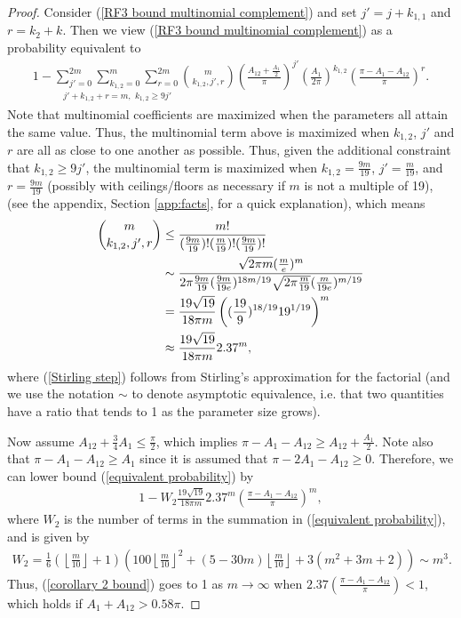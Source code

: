 \documentclass[twoside,11pt]{article}
\begin{document}
\begin{proof}
Consider (\ref{RF3 bound multinomial complement})  and set $j' = j + k_{1,1}$ and $r = k_2 + k$. Then we view (\ref{RF3 bound multinomial complement}) as a probability equivalent to 
\begin{align}\label{equivalent probability}
1 - \underset{j'+k_{1,2}+r = m, \,\, k_{1,2} \geq 9j'}{\sum_{j'=0}^{2m} \sum_{k_{1,2}=0}^m \sum_{r=0}^{2m}} \binom{m}{k_{1,2},j',r} \left(\frac{A_{12}+\frac{A_1}{2}}{\pi} \right)^{j'} \left(\frac{A_1}{2\pi} \right)^{k_{1,2}} \left(\frac{\pi-A_1-A_{12}}{\pi} \right)^{r}.
\end{align}
Note that multinomial coefficients are maximized when the parameters all attain the same value. Thus, the multinomial term above is maximized when $  k_{1,2}$, $j'$ and $r$ are all as close to one another as possible. Thus, given the additional constraint that $k_{1,2} \geq 9j'$, 
the multinomial term is maximized when $k_{1,2}=\frac{9m}{19}$, $j' = \frac{m}{19}$, and $r = \frac{9m}{19}$ (possibly with ceilings/floors as necessary if $m$ is not a multiple of 19), (see the appendix, Section \ref{app:facts}, for a quick explanation),
which means
\begin{align}
\binom{m}{k_{1,2},j',r} &\leq \frac{m!}{(\frac{9m}{19})!(\frac{m}{19})!(\frac{9m}{19})!} \label{facts} \\
&\sim \frac{\sqrt{2\pi m}(\frac{m}{e})^m}{2\pi \frac{9m}{19} (\frac{9m}{19e})^{18m/19} \sqrt{2\pi \frac{m}{19}}(\frac{m}{19e})^{m/19} }\label{Stirling step} \\
&= \frac{19\sqrt{19}}{18\pi m} \left( (\frac{19}{9})^{18/19} {19^{1/19}} \right)^m \notag \\
&\approx \frac{19\sqrt{19}}{18\pi m} 2.37^m, \label{trinomial bound}
\end{align}
where (\ref{Stirling step}) follows from Stirling's approximation for the factorial (and we use the notation $\sim$ to denote asymptotic equivalence, i.e. that two quantities have a ratio that tends to 1 as the parameter size grows). 

Now assume $A_{12} + \frac{3}{4}A_1 \leq \frac{\pi}{2}$, which implies $\pi-A_1-A_{12} \geq A_{12} + \frac{A_1}{2}$. Note also that $\pi-A_1 - A_{12} \geq A_1$ since it is assumed that $\pi-2A_1 - A_{12}\geq 0$. Therefore, we can lower bound (\ref{equivalent probability}) by
\begin{align}\label{corollary 2 bound}
1 - W_2\frac{19\sqrt{19}}{18\pi m} 2.37^m \left(\frac{\pi-A_1-A_{12}}{\pi} \right)^m,
\end{align}
where $W_2$ is the number of terms in the summation in (\ref{equivalent probability}), and is given by
\begin{align}
W_2= \frac{1}{6} \left(\left\lfloor \frac{m}{10} \right\rfloor + 1\right) \left(100 \left\lfloor \frac{m}{10} \right\rfloor^2 + (5 - 30m)\left\lfloor \frac{m}{10} \right\rfloor +3(m^2 + 3m + 2)\right) \sim m^3.
\end{align}
Thus, (\ref{corollary 2 bound}) goes to 1 as $m\rightarrow \infty$ when $2.37\left( \frac{\pi-A_1-A_{12}}{\pi}\right) <1 $, which holds if $A_1+A_{12} > 0.58\pi$.
\end{proof}
\end{document}
